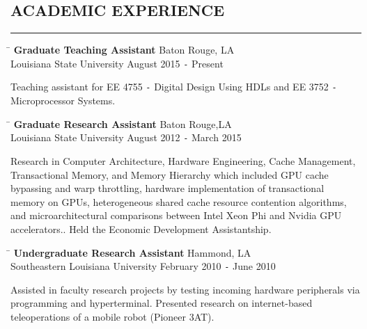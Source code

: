 \documentclass{res}
\begin{document}
\begin{resume}
\section{ACADEMIC EXPERIENCE}
	\vspace{0.005in}	
	\rule{\textwidth}{0.5pt}
	\vspace{-0.4in}
	\begin{tabbing}
		\hspace{4.65in}\= \kill %
		{\bf Graduate Teaching Assistant} \> \hspace{0.3in}Baton Rouge, LA \\
		Louisiana State University \> August 2015 \texttt{-} Present
	\end{tabbing}\vspace{-20pt}
	Teaching assistant for EE 4755 \texttt{-} Digital Design Using HDLs and EE 3752 \texttt{-} Microprocessor Systems.
	\vspace{-0.35in}
	\begin{tabbing}
		\hspace{4.38in}\=  \kill %
		{\bf Graduate Research Assistant}\> \hspace{0.62in}Baton Rouge,LA \\
		Louisiana State University     \>August 2012 \texttt{-} March 2015
	\end{tabbing}\vspace{-20pt}      %
	Research in Computer Architecture, Hardware Engineering, Cache Management, Transactional Memory, and Memory Hierarchy which included GPU cache bypassing and warp throttling, hardware implementation of transactional memory on GPUs, heterogeneous shared cache resource contention algorithms, and microarchitectural comparisons between Intel Xeon Phi and Nvidia GPU accelerators.. Held the Economic Development Assistantship.
	\vspace{-0.2in}
	\begin{tabbing}
		\hspace{4.35in}\= \kill %
		{\bf Undergraduate Research Assistant} \>\hspace{0.75in}Hammond, LA\\
		Southeastern Louisiana University \>  February 2010 \texttt{-} June 2010
		
	\end{tabbing}\vspace{-20pt}
	Assisted in faculty research projects by testing incoming hardware peripherals via programming and hyperterminal. Presented research on internet-based teleoperations of a mobile robot (Pioneer 3AT).

   
	    
\end{resume}
\end{document}
